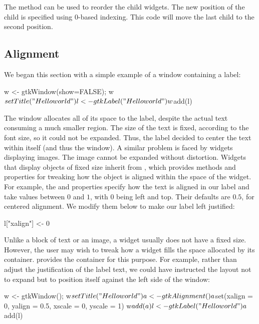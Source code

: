 The  method can be used
to reorder the child widgets. The new position of the child is
specified using 0-based indexing. This code will move the last child
to the second position.
\begin{Schunk}
\end{Schunk}

\subsection{Alignment}
\label{sec:RGtk2:layout:align}

We began this section with a simple example of a window containing a
label:
\begin{Schunk}
\begin{Sinput}
 w <- gtkWindow(show=FALSE); w$setTitle("Hello world")
 l <- gtkLabel("Hello world")
 w$add(l)
\end{Sinput}
\end{Schunk}
%
The window allocates all of its space to the label, despite the actual
text consuming a much smaller region. The size of the text is fixed,
according to the font size, so it could not be expanded. Thus, the
label decided to center the text within itself (and thus the
window). A similar problem is faced by widgets displaying images. The
image cannot be expanded without distortion. Widgets that display
objects of fixed size inherit from , which provides
methods and properties for tweaking how the object is aligned within
the space of the widget. For example, the  and
 properties specify how the text is aligned in our label
and take values between $0$ and $1$, with $0$ being left and
top. Their defaults are $0.5$, for centered alignment. We modify them
below to make our label left justified:
\begin{Schunk}
\begin{Sinput}
 l["xalign"] <- 0
\end{Sinput}
\end{Schunk}

Unlike a block of text or an image, a widget usually does not have a
fixed size. However, the user may wish to tweak how a widget fills
the space allocated by its container.  \GTK\/ provides the
 container for this purpose. For example, rather
than adjust the justification of the label text, we could have
instructed the layout not to expand but to position itself against the
left side of the window:
\begin{Schunk}
\begin{Sinput}
 w <- gtkWindow(); w$setTitle("Hello world")
 a <- gtkAlignment()
 a$set(xalign = 0, yalign = 0.5, xscale = 0, yscale = 1)
 w$add(a)
 l <- gtkLabel("Hello world")
 a$add(l)
\end{Sinput}
\end{Schunk}

